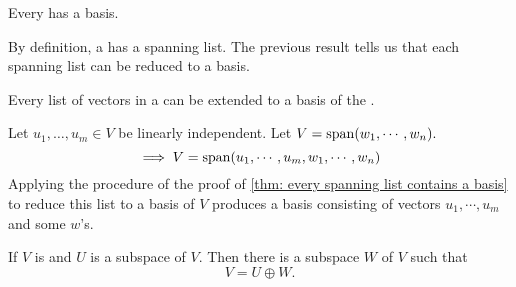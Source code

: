 \setcounter{thm}{30}
\begin{thm}  
  Every \findimvs has a basis.
\end{thm}
\begin{prf}
  By definition, a \fdvs has a spanning list. The previous result tells us that each spanning list can be reduced to a basis. 
\end{prf}

\begin{thm} 
  Every \lid list of vectors in a  \findimvs can be extended to a basis of the \vs. 
\end{thm}
\begin{prf}
  Let $u_1, \ldots, u_m \in V$ be linearly independent. Let $V=\operatorname{span} (w_1, \cdots, w_n).$
  \begin{equation}
    \implies V=\operatorname{span} (u_1, \cdots, u_m, w_1, \cdots, w_n )
  \end{equation}
  Applying the procedure of the proof of \ref{thm: every spanning list contains a basis} to reduce this list to a basis of $V$ produces a basis consisting of vectors $u_1, \cdots, u_m$ and some $w$'s.
\end{prf}

\begin{thm} 
  If $V$ is \fd and $U$ is a subspace of $V$. Then there is a subspace $W$ of $V$ such that 
  \begin{equation}
    V=U \oplus W. 
  \end{equation}
\end{thm}
